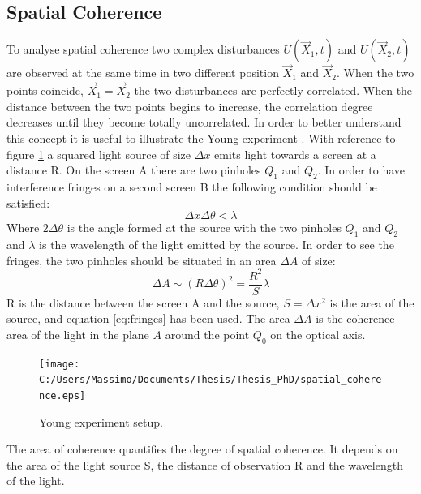 \subsection{Spatial Coherence}
To analyse spatial coherence two complex disturbances $U(\overrightarrow{X}_1,t)$ and $U(\overrightarrow{X}_2,t)$ are observed at the same time in two different position $\overrightarrow{X}_1$ and $\overrightarrow{X}_2$. When the two points coincide, $\overrightarrow{X}_1=\overrightarrow{X}_2$ the two disturbances are perfectly correlated. When the distance between the two points begins to increase, the correlation degree decreases until they become totally uncorrelated. In order to better understand this concept it is useful to illustrate the Young experiment \cite{wolf2007introduction}. With reference to figure \ref{fig:spatialcoherence} a squared light source of size $\Delta x$ emits light towards a screen at a distance R. On the screen A there are two pinholes $Q_1$ and $Q_2$. In order to have interference fringes on a second screen B the following condition should be satisfied:
\begin{equation}
\label{eq:fringes}
\Delta x \Delta \theta < \lambda
\end{equation} 
Where $2\Delta\theta$ is the angle formed at the source with the two pinholes $Q_1$ and $Q_2$ and $\lambda$ is the wavelength of the light emitted by the source. In order to see the fringes, the two pinholes should be situated in an area $\Delta A$ of size:
\begin{equation}
\label{eq:area1}
\Delta A \sim (R \Delta \theta)^2 = \dfrac{R^2}{S}\lambda
\end{equation} 
R is the distance between the screen A and the source, $S=\Delta x^2$ is the area of the source, and equation \ref{eq:fringes} has been used. The area $\Delta A$ is the coherence area of the light in the plane $A$ around the point $Q_0$ on the optical axis. 
 \begin{figure}[H]
	\centering
	\texttt{[image: C:/Users/Massimo/Documents/Thesis/Thesis\_PhD/spatial\_coherence.eps]}
	\caption{\label{fig:spatialcoherence} Young experiment setup.}
\end{figure}
The area of coherence quantifies the degree of spatial coherence. It depends on the area of the light source S, the distance of observation R and the wavelength of the light. 
